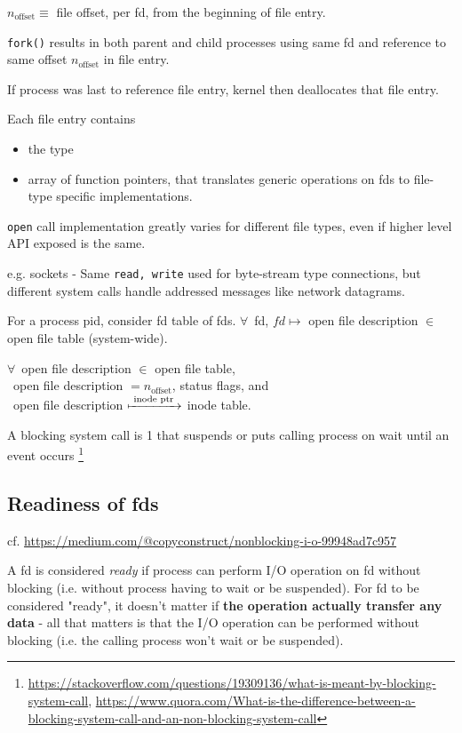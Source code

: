 \documentclass[10pt]{amsart}
\begin{document}
\begin{multicols*}{2}
$n_{\text{offset}} \equiv $ file offset, per fd, from the beginning of file entry.

\texttt{fork()} results in both parent and child processes using same fd and reference to same offset $n_{\text{offset}}$ in file entry.

If process was last to reference file entry, kernel then deallocates that file entry.


Each file entry contains
\begin{itemize}
	\item the type
	\item array of function pointers, that translates generic operations on fds to file-type specific implementations.
\end{itemize}

\texttt{open} call implementation greatly varies for different file types, even if higher level API exposed is the same.

e.g. sockets - Same \texttt{read, write} used for byte-stream type connections, but different system calls handle addressed messages like network datagrams.


For a process pid, consider fd table of fds. $\forall \, $ fd, $fd \mapsto $ open file description $\in$ open file table (system-wide).

$\forall \, $ open file description $\in $ open file table, \\
\qquad \, open file description $= n_{\text{offset}}$, status flags, and \\
\qquad \, open file description $\xmapsto{ \text{ inode ptr } }$ inode table.

A blocking system call is 1 that suspends or puts calling process on wait until an event occurs \footnote{\url{https://stackoverflow.com/questions/19309136/what-is-meant-by-blocking-system-call}, \url{https://www.quora.com/What-is-the-difference-between-a-blocking-system-call-and-an-non-blocking-system-call}}

\subsection{Readiness of fds}

cf. \url{https://medium.com/@copyconstruct/nonblocking-i-o-99948ad7c957}

A fd is considered \emph{ready} if process can perform I/O operation on fd without blocking (i.e. without process having to wait or be suspended). For fd to be considered "ready", it doesn't matter if \textbf{the operation actually transfer any data} - all that matters is that the I/O operation can be performed without blocking (i.e. the calling process won't wait or be suspended).


\end{multicols*}
\end{document}
